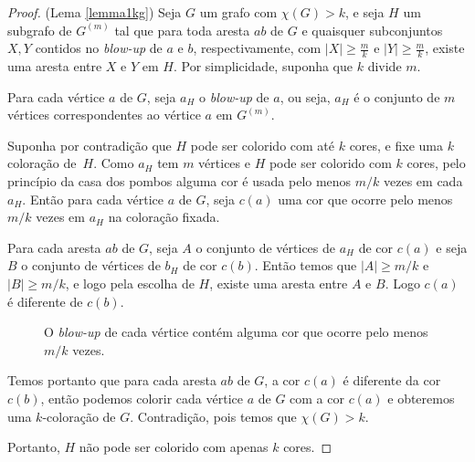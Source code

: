 \begin{proof}{(Lema \ref{lemma1kg})} Seja $G$ um grafo com $\chi(G) > k$, e seja $H$ um subgrafo de $G^{(m)}$ tal que para toda aresta $ab$ de $G$ e quaisquer subconjuntos $X,Y$ contidos no \textit{blow-up} de $a$ e $b$, respectivamente, com $|X| \geq \frac{m}{k}$ e $|Y| \geq \frac{m}{k}$, existe uma aresta entre $X$ e $Y$ em $H$. Por simplicidade, suponha que $k$ divide $m$.

Para cada vértice $a$ de $G$, seja $a_H$ o \textit{blow-up} de $a$, ou seja, $a_H$ é o conjunto de $m$ vértices correspondentes ao vértice $a$ em $G^{(m)}$.

Suponha por contradição que $H$ pode ser colorido com até $k$ cores, e fixe uma $k$ coloração de~$H$. Como $a_H$ tem $m$ vértices e $H$ pode ser colorido com $k$ cores, pelo princípio da casa dos pombos alguma cor é usada pelo menos $m/k$ vezes em cada $a_H$. Então para cada vértice $a$ de $G$, seja $c(a)$ uma cor que ocorre pelo menos $m/k$ vezes em $a_H$ na coloração fixada.

Para cada aresta $ab$ de $G$, seja $A$ o conjunto de vértices de $a_H$ de cor $c(a)$ e seja $B$ o conjunto de vértices de $b_H$ de cor $c(b)$. Então temos que $|A| \geq m/k$ e $|B| \geq m/k$, e logo pela escolha de $H$, existe uma aresta entre $A$ e $B$. Logo $c(a)$ é diferente de $c(b)$.

\begin{figure}[H]
\centering
{}
\caption{O \textit{blow-up} de cada vértice contém alguma cor que ocorre pelo menos $m/k$ vezes.}
\label{fig:knesercolorsets}
\end{figure}

Temos portanto que para cada aresta $ab$ de $G$, a cor $c(a)$ é diferente da cor $c(b)$, então podemos colorir cada vértice $a$ de $G$ com a cor $c(a)$ e obteremos uma $k$-coloração de $G$. Contradição, pois temos que $\chi(G) > k$.

Portanto, $H$ não pode ser colorido com apenas $k$ cores.

\end{proof}

